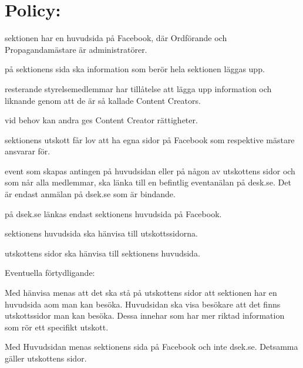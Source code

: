 \documentclass{dsekprotokoll}
\begin{document}
\section{Policy:}
\begin{attlista}
	\item sektionen har en huvudsida på Facebook, där Ordförande och Propagandamästare är
	administratörer.
	\item på sektionens sida ska information som berör hela sektionen läggas upp.
	\item resterande styrelsemedlemmar har tillåtelse att lägga upp information och liknande genom att de är så kallade Content Creators.
	\item vid behov kan andra ges Content Creator rättigheter.
	\item  sektionens utskott får lov att ha egna sidor på Facebook som respektive mästare ansvarar
	för.
	\item event som skapas antingen på huvudsidan eller på någon av utskottens sidor och som
	når alla medlemmar, ska länka till en befintlig eventanälan på desk.se. Det är endast anmälan på dsek.se som är bindande.
	\item på dsek.se länkas endast sektionens huvudsida på Facebook.
	\item sektionens huvudsida ska hänvisa till utskottssidorna.
	\item utskottens sidor ska hänvisa till sektionens huvudsida.

\end{attlista}

Eventuella förtydligande:

Med hänvisa menas att det ska stå på utskottens sidor att sektionen har en huvudsida aom man
kan besöka. Huvudsidan ska visa besökare att det finns utskottssidor man kan besöka. Dessa
innehar som har mer riktad information som rör ett specifikt utskott.

Med Huvudsidan menas sektionens sida på Facebook och inte dsek.se. Detsamma gäller utskottens sidor.
\end{document}
